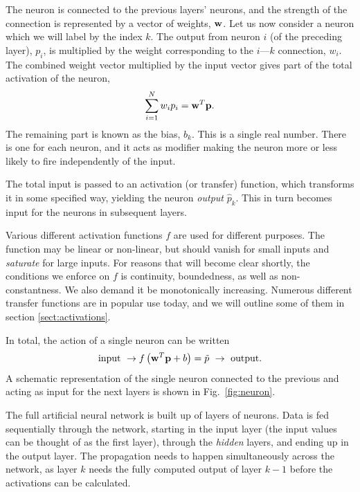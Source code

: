 \documentclass[a4paper, twocolumn]{article}
\newcommand{\fig}[1]{Fig.\ \ref{fig:#1}}
\begin{document}
The neuron is connected to the previous layers' neurons, and the strength of the connection is represented by a vector of weights, ${\bf w}$. Let us now consider a neuron which we will label by the index $k$. The output from neuron $i$ (of the preceding layer), $p_i$, is multiplied by the weight corresponding to the $i$\----$k$ connection, $w_i$. The combined weight vector multiplied by the input vector gives part of the total activation of the neuron, 
\begin{align}
\sum_{i=1}^Nw_ip_i = {\bf w}^T{\bf p}.
\end{align}
The remaining part is known as the bias, $b_k$. This is a single real number. There is one for each neuron, and it acts as modifier making the neuron more or less likely to fire independently of the input. 

The total input is passed to an activation (or transfer) function, which transforms it in some specified way, yielding the neuron \emph{output} $\hat p_k$. This in turn becomes input for the neurons in subsequent layers. 

Various different activation functions $f$ are used for different purposes. The function may be linear or non-linear, but should vanish for small inputs and \emph{saturate} for large inputs. For reasons that will become clear shortly, the conditions we enforce on $f$ is continuity, boundedness, as well as non-constantness. We also demand it be monotonically increasing. Numerous different transfer functions are in popular use today, and we will outline some of them in section \ref{sect:activations}.

In total, the action of a single neuron can be written
\begin{align}
\text{input}\ \rightarrow f\left({\bf w}^T{\bf p}+b\right) = \tilde p \ \rightarrow \ \text{output}.
\end{align}
A schematic representation of the single neuron connected to the previous and acting as input for the next layers is shown in \fig{neuron}. 

The full artificial neural network is built up of layers of neurons. Data is fed sequentially through the network, starting in the input layer (the input values can be thought of as the first layer), through the \emph{hidden} layers, and ending up in the output layer. The propagation needs to happen simultaneously across the network, as layer $k$ needs the fully computed output of layer $k-1$ before the activations can be calculated. 
\end{document}

